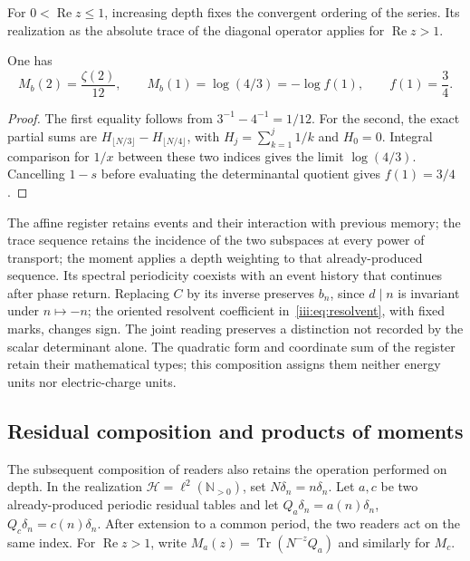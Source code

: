For $0<\operatorname{Re}z\leq1$, increasing depth fixes the
convergent ordering of the series. Its realization as the absolute
trace of the diagonal operator applies for $\operatorname{Re}z>1$.

\begin{corollary}
\label{amp-afin-cor-extremos}
One has
\begin{equation}
 M_b(2)=\frac{\zeta(2)}{12},\qquad
 M_b(1)=\log(4/3)=-\log f(1),\qquad f(1)=\frac34.
 \label{amp-afin-extremos}
\end{equation}
\end{corollary}
\begin{proof}
The first equality follows from $3^{-1}-4^{-1}=1/12$.
For the second, the exact partial sums are
$H_{\lfloor N/3\rfloor}-H_{\lfloor N/4\rfloor}$, with
$H_j=\sum_{k=1}^j1/k$ and $H_0=0$.
Integral comparison for $1/x$ between these two indices gives
the limit $\log(4/3)$. Cancelling $1-s$ before evaluating the
determinantal quotient gives $f(1)=3/4$.
\end{proof}

The affine register retains events and their interaction with previous
memory; the trace sequence retains the incidence of the two subspaces
at every power of transport; the moment applies a depth weighting
to that already-produced sequence. Its spectral periodicity coexists
with an event history that continues after phase return.
Replacing $C$ by its inverse preserves $b_n$, since $d\mid n$
is invariant under $n\mapsto-n$; the oriented resolvent coefficient
in~\eqref{iii:eq:resolvent}, with fixed marks, changes sign.
The joint reading preserves a distinction not recorded by the
scalar determinant alone. The quadratic form and coordinate sum
of the register retain their mathematical types; this composition
assigns them neither energy units nor electric-charge units.

\subsection{Residual composition and products of moments}
\label{amp-afin-sec-productos}

The subsequent composition of readers also retains the operation
performed on depth. In the realization
$\mathcal H=\ell^2(\mathbb N_{>0})$, set
$N\delta_n=n\delta_n$. Let $a,c$ be two already-produced periodic
residual tables and let $Q_a\delta_n=a(n)\delta_n$,
$Q_c\delta_n=c(n)\delta_n$. After extension to a common period,
the two readers act on the same index. For
$\operatorname{Re}z>1$, write
$M_a(z)=\operatorname{Tr}(N^{-z}Q_a)$ and similarly for $M_c$.

